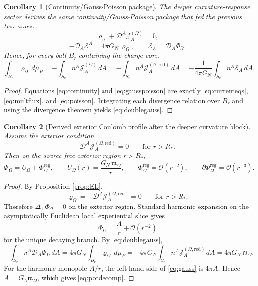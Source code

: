 \documentclass[11pt]{article}
\newcommand{\SpatialD}{\mathcal D}
\newcommand{\LapPerp}{\Delta_\perp}
\newcommand{\FlowPot}{\Phi_\Omega}
\newcommand{\FlowPotReg}{\Phi_\Omega^{\mathrm{reg}}}
\newcommand{\CoulPot}{U_\Omega}
\newcommand{\SourceDensity}{\varrho_\Omega}
\newcommand{\SourceCurrent}{\mathcal J^{(\Omega)}}
\newcommand{\SourceCurrentRed}{\mathcal J^{(\Omega,\mathrm{red})}}
\newcommand{\SourceFlux}{\mathcal E}
\newcommand{\HamChargeOmega}{\mathfrak m_\Omega}
\newtheorem{corollary}{Corollary}
\begin{document}
\begin{corollary}[Continuity/Gauss-Poisson package]
\label{cor:continuity}
The deeper curvature-response sector derives the same continuity/Gauss-Poisson package that fed the previous two notes:
\begin{equation}
\SourceDensity+\SpatialD^A\SourceCurrent_A=0,
\label{eq:continuity}
\end{equation}
\begin{equation}
-\SpatialD_A\SourceFlux^A=4\pi G_N\,\SourceDensity,
\qquad
\SourceFlux_A=\SpatialD_A\FlowPot.
\label{eq:gausspoisson}
\end{equation}
Hence, for every ball \(B_r\) containing the charge core,
\begin{equation}
\int_{B_r}\SourceDensity\,d\mu_P
=
-\int_{S_r}n^A\SourceCurrent_A\,dA
=
-\int_{S_r}n^A\SourceCurrentRed_A\,dA
=
-\frac{1}{4\pi G_N}\int_{S_r}n^A\SourceFlux_A\,dA.
\label{eq:doublegauss}
\end{equation}
\end{corollary}

\begin{proof}
Equations \eqref{eq:continuity} and \eqref{eq:gausspoisson} are exactly \eqref{eq:currenteqs}, \eqref{eq:multflux}, and \eqref{eq:poisson}. Integrating each divergence relation over \(B_r\) and using the divergence theorem yields \eqref{eq:doublegauss}.
\end{proof}

\begin{corollary}[Derived exterior Coulomb profile after the deeper curvature block]
\label{cor:coulomb}
Assume the exterior condition
\begin{equation}
\SpatialD^A\SourceCurrentRed_A=0
\qquad
\text{for } r>R_\ast.
\label{eq:exteriorcurrent}
\end{equation}
Then on the source-free exterior region \(r>R_\ast\),
\begin{equation}
\FlowPot
=
\CoulPot+\FlowPotReg,
\qquad
\CoulPot(r)=\frac{G_N\,\HamChargeOmega}{r},
\qquad
\FlowPotReg=\mathcal O(r^{-2}),
\qquad
\partial\FlowPotReg=\mathcal O(r^{-3}).
\label{eq:potdecomp}
\end{equation}
\end{corollary}

\begin{proof}
By Proposition \ref{prop:EL},
\[
\SourceDensity
=
-\SpatialD^A\SourceCurrentRed_A
=
0
\qquad
\text{for } r>R_\ast.
\]
Therefore \(\LapPerp\FlowPot=0\) on the exterior region. Standard harmonic expansion on the asymptotically Euclidean local experiential slice gives
\[
\FlowPot=\frac{A}{r}+\mathcal O(r^{-2})
\]
for the unique decaying branch. By \eqref{eq:doublegauss},
\begin{equation}
-\int_{S_r}n^A\SpatialD_A\FlowPot\,dA
=
4\pi G_N\int_{B_r}\SourceDensity\,d\mu_P
=
-4\pi G_N\int_{S_r}n^A\SourceCurrentRed_A\,dA
=
4\pi G_N\,\HamChargeOmega.
\label{eq:gauss}
\end{equation}
For the harmonic monopole \(A/r\), the left-hand side of \eqref{eq:gauss} is \(4\pi A\). Hence \(A=G_N\HamChargeOmega\), which gives \eqref{eq:potdecomp}.
\end{proof}
\end{document}

